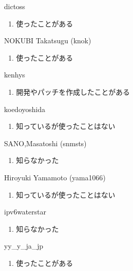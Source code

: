 \begin{prework}{ dictoss }
  \begin{enumerate}
  \item 使ったことがある
  \end{enumerate}
\end{prework}

\begin{prework}{ NOKUBI Takatsugu (knok) }
  \begin{enumerate}
  \item 使ったことがある
  \end{enumerate}
\end{prework}

\begin{prework}{ kenhys }
  \begin{enumerate}
  \item 開発やパッチを作成したことがある
  \end{enumerate}
\end{prework}

\begin{prework}{ koedoyoshida }
  \begin{enumerate}
  \item 知っているが使ったことはない
  \end{enumerate}
\end{prework}

\begin{prework}{ SANO,Masatoshi (snmsts) }
  \begin{enumerate}
  \item 知らなかった
  \end{enumerate}
\end{prework}

\begin{prework}{ Hiroyuki Yamamoto (yama1066) }
  \begin{enumerate}
  \item 知っているが使ったことはない
  \end{enumerate}
\end{prework}

\begin{prework}{ ipv6waterstar }
  \begin{enumerate}
  \item 知らなかった
  \end{enumerate}
\end{prework}

\begin{prework}{ yy\_y\_ja\_jp }
  \begin{enumerate}
  \item 使ったことがある
  \end{enumerate}
\end{prework}
